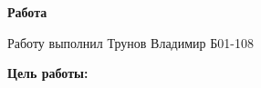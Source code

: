 

\shiftedText{0.5cm}{14cm}
{

    \begin{center}
    \vspace*{1.0cm}

        {\bf\huge Работа \labnum }

    \vspace*{0.2cm}

        {\bf\Large \labname }

    \vspace*{0.8cm}

        {\Large Работу выполнил Трунов Владимир Б01-108 }

    \vspace*{1.6cm}

    \end{center}

    {\bf\noindent Цель работы: } \labobj

}

\newpage